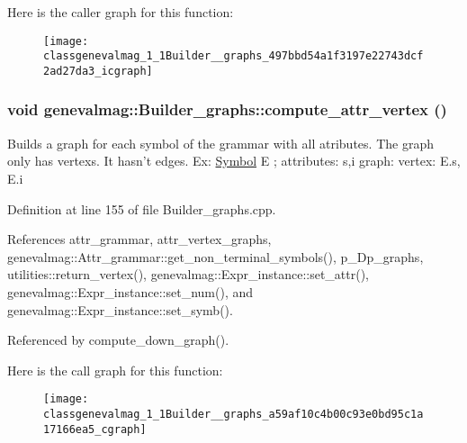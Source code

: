 Here is the caller graph for this function:\nopagebreak
\begin{figure}[H]
\begin{center}
\leavevmode
\texttt{[image: classgenevalmag\_1\_1Builder\_\_graphs\_497bbd54a1f3197e22743dcf2ad27da3\_icgraph]}
\end{center}
\end{figure}
\hypertarget{classgenevalmag_1_1Builder__graphs_a59af10c4b00c93e0bd95c1a17166ea5}{
\subsubsection[{compute\_\-attr\_\-vertex}]{\setlength{\rightskip}{0pt plus 5cm}void genevalmag::Builder\_\-graphs::compute\_\-attr\_\-vertex ()}}
\label{classgenevalmag_1_1Builder__graphs_a59af10c4b00c93e0bd95c1a17166ea5}


Builds a graph for each symbol of the grammar with all atributes. The graph only has vertexs. It hasn't edges. Ex: \hyperlink{classgenevalmag_1_1Symbol}{Symbol} E ; attributes: s,i graph: vertex: E.s, E.i 

Definition at line 155 of file Builder\_\-graphs.cpp.

References attr\_\-grammar, attr\_\-vertex\_\-graphs, genevalmag::Attr\_\-grammar::get\_\-non\_\-terminal\_\-symbols(), p\_\-Dp\_\-graphs, utilities::return\_\-vertex(), genevalmag::Expr\_\-instance::set\_\-attr(), genevalmag::Expr\_\-instance::set\_\-num(), and genevalmag::Expr\_\-instance::set\_\-symb().

Referenced by compute\_\-down\_\-graph().

Here is the call graph for this function:\nopagebreak
\begin{figure}[H]
\begin{center}
\leavevmode
\texttt{[image: classgenevalmag\_1\_1Builder\_\_graphs\_a59af10c4b00c93e0bd95c1a17166ea5\_cgraph]}
\end{center}
\end{figure}


